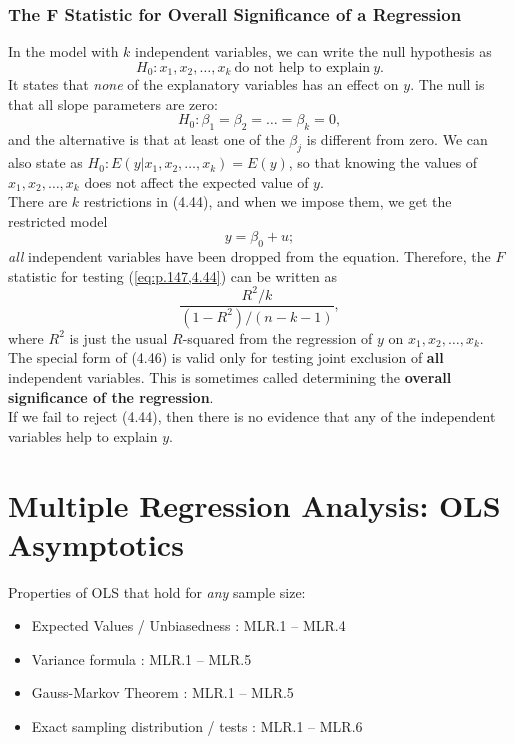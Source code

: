 \documentclass[a4paper, 10pt]{article}
\theoremstyle{definition}	%
\begin{document}
\subsubsection{The F Statistic for Overall Significance of a Regression}
In the model with $k$ independent variables, we can write the null hypothesis as
\begin{equation*}
    H_0: x_1, x_2, \dots, x_k \ \text{do not help to explain} \ y.    
\end{equation*}
It states that \textit{none} of the explanatory variables has an effect on $y$. The null is that all slope parameters are zero:
\begin{equation}
    H_0: \beta_1 = \beta_2 = \dots = \beta_k = 0, \label{eq:p.147,4.44}
\end{equation}
and the alternative is that at least one of the $\beta_j$ is different from zero. We can also state as $H_0: E(y|x_1, x_2, \dots, x_k) = E(y)$, so that knowing the values of $x_1, x_2, \dots, x_k$ does not affect the expected value of $y$.\\
There are $k$ restrictions in (4.44), and when we impose them, we get the restricted model
\begin{equation}
    y = \beta_0 + u; \label{eq:p.147,4.45}
\end{equation}
\textit{all} independent variables have been dropped from the equation. 
Therefore, the $F$ statistic for testing (\ref{eq:p.147,4.44}) can be written as
\begin{equation}
    \frac{R^2 / k}{(1 - R^2) / (n - k - 1)}, \label{eq:p.147,4.46}
\end{equation}
where $R^2$ is just the usual $R$-squared from the regression of $y$ on $x_1, x_2, \dots, x_k$.
The special form of (4.46) is valid only for testing joint exclusion of \textbf{all} independent variables. This is sometimes called determining the \textbf{overall significance of the regression}.\\
If we fail to reject (4.44), then there is no evidence that any of the independent variables help to explain $y$. 

\newpage

\section{Multiple Regression Analysis: OLS Asymptotics}
\setcounter{equation}{0}
\setcounter{theorem}{0}
\setcounter{assumption}{0}

Properties of OLS that hold for \textit{any} sample size:
\begin{itemize}
    \item Expected Values / Unbiasedness : MLR.1 -- MLR.4
    \item Variance formula : MLR.1 -- MLR.5
    \item Gauss-Markov Theorem : MLR.1 -- MLR.5
    \item Exact sampling distribution / tests : MLR.1 -- MLR.6
\end{itemize}
\end{document}
